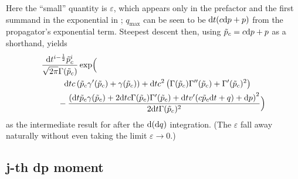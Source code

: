 Here the ``small'' quantity is \(\varepsilon\), which appears only in the prefactor and the first summand in the exponential in ; \(q_{\text{max}}\) can be seen to be \(\mathrm{d} t (c \mathrm{d} p+p)\) from the propagator's exponential term. Steepest descent then, using \(\tilde p_c = c \mathrm{d} p + p\) as a shorthand, yields
\begin{align}
	\label{eqn:dq-integration-finished}
	& \frac{\mathrm{d} t^{i-\frac12} \tilde p_c^i}{\sqrt{2 \pi } \Gamma (\tilde p_c)} \operatorname{exp} \Bigl(
		\\ &\qquad \notag
		\phantom{+}\mathrm{d} t c  \left(\tilde p_c \gamma '(\tilde p_c)
		+\gamma (\tilde p_c)\right)
		+\mathrm{d} t c ^2 \left(\Gamma (\tilde p_c) \Gamma ''(\tilde p_c)
		+\Gamma '(\tilde p_c)^2\right)
		\\ &\qquad \notag
		-\frac{\left(\mathrm{d} t \tilde p_c \gamma (\tilde p_c)
		+2 \mathrm{d} t c  \Gamma (\tilde p_c) \Gamma '(\tilde p_c)
		+\mathrm{d} t v'(c  \tilde p_c \mathrm{d} t +q)+\mathrm{d} p\right)^2}{2 \mathrm{d} t \Gamma (\tilde p_c)^2}
	 \Bigr)
\end{align}
as the intermediate result for  after the \(\mathrm{d}(\mathrm{d} q)\) integration. (The \(\varepsilon\) fall away naturally without even taking the limit \(\varepsilon\to0\).)



\subsection{j-th dp moment}

